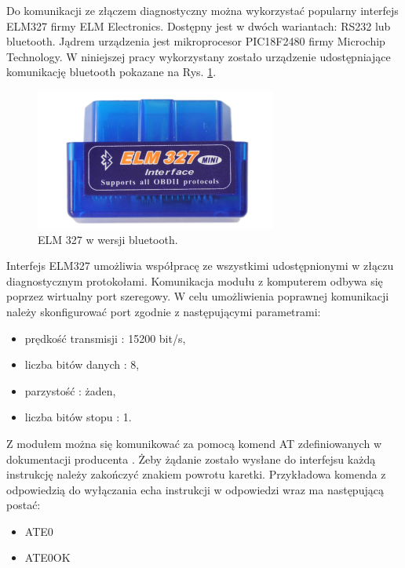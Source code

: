 \documentclass[12pt, twoside]{article} %
\numberwithin{equation}{subsection}
\numberwithin{figure}{section}
\numberwithin{table}{section}
\begin{document}
	\hspace{0.5cm}Do komunikacji ze złączem diagnostyczny można wykorzystać popularny interfejs ELM327 firmy ELM Electronics. Dostępny jest w dwóch wariantach: RS232 lub bluetooth. Jądrem urządzenia jest mikroprocesor PIC18F2480 firmy Microchip Technology. W niniejszej pracy wykorzystany zostało urządzenie udostępniające komunikację bluetooth pokazane na Rys. \ref{rys_elm327}.
	
	\begin{figure}[ht]
		\centering
		\includegraphics[scale=1]{Images/rys_elm327.png}
		\caption{ELM 327 w wersji bluetooth.}
		\label{rys_elm327}
		\end{figure}
	
	Interfejs ELM327 umożliwia współpracę ze wszystkimi udostępnionymi w złączu diagnostycznym protokołami. Komunikacja modułu z komputerem odbywa się poprzez wirtualny port szeregowy. W celu umożliwienia poprawnej komunikacji należy skonfigurować port zgodnie z następującymi parametrami:
	
	\begin{itemize}
		\item{prędkość transmisji : 15200 bit/s,}
		\item{liczba bitów danych : 8,}
		\item{parzystość : żaden,}
		\item{liczba bitów stopu : 1.}
	\end{itemize}	
	
	Z modułem można się komunikować za pomocą komend AT zdefiniowanych w dokumentacji producenta \cite{elm327}. Żeby żądanie zostało wysłane do interfejsu każdą instrukcję należy zakończyć znakiem powrotu karetki. Przykładowa komenda z odpowiedzią do wyłączania echa instrukcji w odpowiedzi wraz ma następującą postać:
	
	\begin{itemize}
		\item{ATE0}
		\item{ATE0OK}
	\end{itemize}	
	
\end{document}
